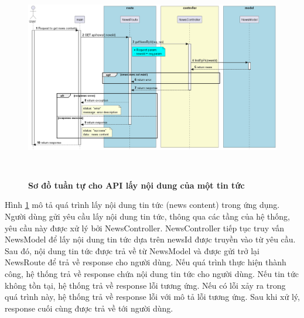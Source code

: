 \begin{figure}[H]
  \centering
  \includegraphics[width=16cm,height=9cm]{Images/server/sequence/server/getNewsById.png}
  \caption[Sơ đồ tuần tự cho API lấy nội dung của một tin tức ]{\bfseries \fontsize{12pt}{0pt}
  \selectfont Sơ đồ tuần tự cho API lấy nội dung của một tin tức }
  \label{getNewsById} %
\end{figure}
Hình \ref{getNewsById} mô tả quá trình lấy nội dung tin tức (news content) trong ứng dụng. Người dùng gửi yêu cầu lấy nội dung tin tức, thông qua các tầng của hệ thống, yêu cầu này được xử lý bởi NewsController. NewsController tiếp tục truy vấn NewsModel để lấy nội dung tin tức dựa trên newsId được truyền vào từ yêu cầu. Sau đó, nội dung tin tức được trả về từ NewsModel và được gửi trở lại NewsRoute để trả về response cho người dùng. Nếu quá trình thực hiện thành công, hệ thống trả về response chứa nội dung tin tức cho người dùng. Nếu tin tức không tồn tại, hệ thống trả về response lỗi tương ứng. Nếu có lỗi xảy ra trong quá trình này, hệ thống trả về response lỗi với mô tả lỗi tương ứng. Sau khi xử lý, response cuối cùng được trả về tới người dùng.

